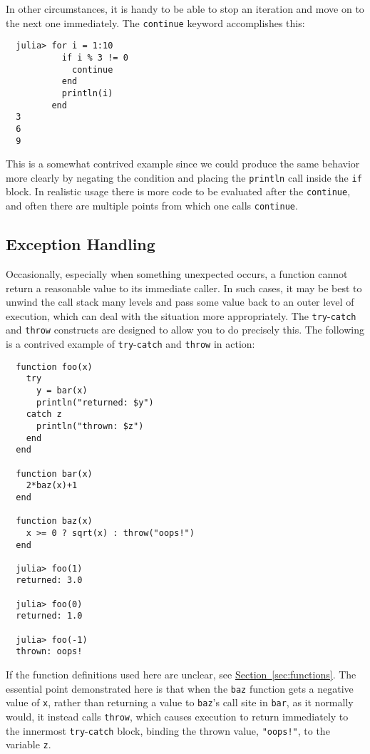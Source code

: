 \documentclass{article}
\renewcommand{\sec}[1]{\label{sec:#1}}
\newcommand{\Section}[1]{\hyperref[sec:#1]{Section~\ref*{sec:#1}}}
\begin{document}
In other circumstances, it is handy to be able to stop an iteration and move on to the next one immediately.
The \verb|continue| keyword accomplishes this:
\begin{verbatim}
  julia> for i = 1:10
           if i % 3 != 0
             continue
           end
           println(i)
         end
  3
  6
  9
\end{verbatim}
This is a somewhat contrived example since we could produce the same behavior more clearly by negating the condition and placing the \verb|println| call inside the \verb|if| block.
In realistic usage there is more code to be evaluated after the \verb|continue|, and often there are multiple points from which one calls \verb|continue|.

\subsection{Exception Handling}\sec{exception-handling}

Occasionally, especially when something unexpected occurs, a function cannot return a reasonable value to its immediate caller.
In such cases, it may be best to unwind the call stack many levels and pass some value back to an outer level of execution, which can deal with the situation more appropriately.
The \verb|try|-\verb|catch| and \verb|throw| constructs are designed to allow you to do precisely this.
The following is a contrived example of \verb|try|-\verb|catch| and \verb|throw| in action:
\begin{verbatim}
  function foo(x)
    try
      y = bar(x)
      println("returned: $y")
    catch z
      println("thrown: $z")
    end
  end

  function bar(x)
    2*baz(x)+1
  end

  function baz(x)
    x >= 0 ? sqrt(x) : throw("oops!")
  end

  julia> foo(1)
  returned: 3.0

  julia> foo(0)
  returned: 1.0

  julia> foo(-1)
  thrown: oops!
\end{verbatim}
If the function definitions used here are unclear, see \Section{functions}.
The essential point demonstrated here is that when the \verb|baz| function gets a negative value of \verb|x|, rather than returning a value to \verb|baz|'s call site in \verb|bar|, as it normally would, it instead calls \verb|throw|, which causes execution to return immediately to the innermost \verb|try|-\verb|catch| block, binding the thrown value, \verb|"oops!"|, to the variable \verb|z|.
\end{document}
